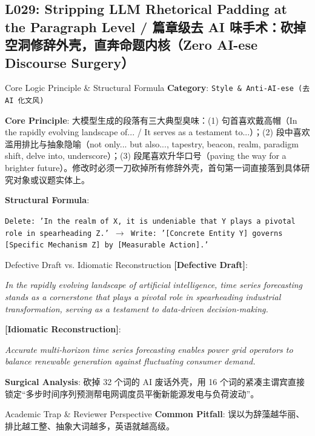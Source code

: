 \subsection{L029: Stripping LLM Rhetorical Padding at the Paragraph Level / 篇章级去 AI 味手术：砍掉空洞修辞外壳，直奔命题内核（Zero AI-ese Discourse Surgery）}\label{sec:logic:L029}
\begin{ConceptBox}{Core Logic Principle \& Structural Formula}
\textbf{Category}: \texttt{Style \& Anti-AI-ese (去 AI 化文风)}\par\vspace{3pt}
\textbf{Core Principle}: 大模型生成的段落有三大典型臭味：(1)  句首喜欢戴高帽（In the rapidly evolving landscape of... / It serves as a testament to...）；(2)  段中喜欢滥用排比与抽象隐喻（not only... but also..., tapestry, beacon, realm, paradigm shift, delve into, underscore）；(3)  段尾喜欢升华口号（paving the way for a brighter future）。修改时必须一刀砍掉所有修辞外壳，首句第一词直接落到具体研究对象或议题实体上。\par\vspace{4pt}
\textbf{Structural Formula}:\par\noindent\texttt{Delete: 'In the realm of X, it is undeniable that Y plays a pivotal role in spearheading Z.' $\to$ Write: '[Concrete Entity Y] governs [Specific Mechanism Z] by [Measurable Action].'}
\end{ConceptBox}
\begin{ExampleBox}{Defective Draft vs. Idiomatic Reconstruction}
\textbf{\color{TargetHighlight}[Defective Draft]}:\par\textit{In the rapidly evolving landscape of artificial intelligence, time series forecasting stands as a cornerstone that plays a pivotal role in spearheading industrial transformation, serving as a testament to data-driven decision-making.}\par\vspace{4pt}
\textbf{\color{AcadNavy}[Idiomatic Reconstruction]}:\par\textit{Accurate multi-horizon time series forecasting enables power grid operators to balance renewable generation against fluctuating consumer demand.}\par\vspace{4pt}
\textbf{Surgical Analysis}: 砍掉 32 个词的 AI 废话外壳，用 16 个词的紧凑主谓宾直接锁定“多步时间序列预测帮电网调度员平衡新能源发电与负荷波动”。
\end{ExampleBox}
\begin{TipBox}{Academic Trap \& Reviewer Perspective}
\textbf{Common Pitfall}: 误以为辞藻越华丽、排比越工整、抽象大词越多，英语就越高级。
\end{TipBox}
\vspace{6pt}
